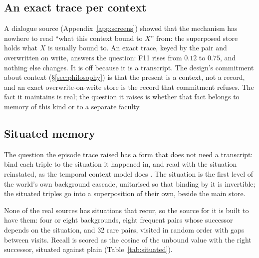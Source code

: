 \documentclass[11pt,a4paper]{article}
\theoremstyle{plain}
\theoremstyle{definition}
\theoremstyle{remark}
\begin{document}
\subsection{An exact trace per context}

A dialogue source (Appendix~\ref{app:screens}) showed that the mechanism has
nowhere to read ``what this context bound to $X$'' from: the superposed store
holds what $X$ is usually bound to. An exact trace, keyed by the pair and
overwritten on write, answers the question: F11 rises from $0.12$ to $0.75$,
and nothing else changes. It is off because it is a transcript. The design's
commitment about context (\S\ref{sec:philosophy}) is that the present is a
context, not a record, and an exact overwrite-on-write store is the record that
commitment refuses. The fact it maintains is real; the question it raises is
whether that fact belongs to memory of this kind or to a separate faculty.

\subsection{Situated memory}
\label{sec:situated}

The question the episode trace raised has a form that does not need a
transcript: bind each triple to the situation it happened in, and read with the
situation reinstated, as the temporal context model does
\citep{howard2002distributed}. The situation is the first level of the world's
own background cascade, unitarised so that binding by it is invertible; the
situated triples go into a superposition of their own, beside the main store.

None of the real sources has situations that recur, so the source for it is
built to have them: four or eight backgrounds,
eight frequent pairs whose successor depends on the situation, and 32 rare
pairs, visited in random order with gaps between visits. Recall is scored as
the cosine of the unbound value with the right successor, situated against
plain (Table~\ref{tab:situated}).
\end{document}
